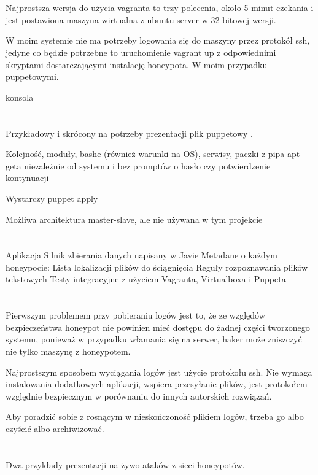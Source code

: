 \documentclass[runningheads,a4paper]{llncs}
\begin{document}
\section{}
Najprostsza wersja do użycia vagranta to trzy polecenia, około 5 minut czekania i jest postawiona maszyna wirtualna z ubuntu server w 32 bitowej wersji.

W moim systemie nie ma potrzeby logowania się do maszyny przez protokół ssh, jedyne co będzie potrzebne to uruchomienie vagrant up z odpowiednimi skryptami dostarczającymi instalację honeypota. W moim przypadku puppetowymi.

konsola
\section{}
Przykładowy i skrócony na potrzeby prezentacji plik puppetowy .

Kolejność, moduły, bashe (również warunki na OS), serwisy, paczki z pipa apt-geta niezależnie od systemu i bez promptów o hasło czy potwierdzenie kontynuacji

Wystarczy puppet apply

Możliwa architektura master-slave, ale nie używana w tym projekcie

\section{}
Aplikacja
Silnik zbierania danych napisany w Javie
Metadane o każdym honeypocie:
Lista lokalizacji plików do ściągnięcia
Reguły rozpoznawania plików tekstowych
Testy integracyjne z użyciem Vagranta, Virtualboxa i Puppeta
\section{}
Pierwszym problemem przy pobieraniu logów jest to, że ze względów bezpieczeństwa honeypot nie powinien mieć dostępu do żadnej części tworzonego systemu, ponieważ w przypadku włamania się na serwer, haker może zniszczyć nie tylko maszynę z honeypotem.

Najprostszym sposobem wyciągania logów jest użycie protokołu ssh. Nie wymaga instalowania dodatkowych aplikacji, wspiera przesyłanie plików, jest protokołem względnie bezpiecznym w porównaniu do innych autorskich rozwiązań.

Aby poradzić sobie z rosnącym w nieskończoność plikiem logów, trzeba go albo czyścić albo archiwizować.

\section{}
Dwa przykłady prezentacji na żywo ataków z sieci honeypotów.
\end{document}
